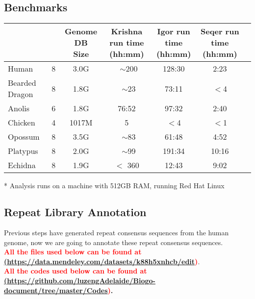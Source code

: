 \documentclass[12pt]{report}
\begin{document}
\subsection{Benchmarks}

\footnotesize  %
\setlength\tabcolsep{1.5pt}
\begin{center}
	\begin{tabular}{|l|c|c|c|c|c|c|}
		\hline
		\thead{Genome}	&	\thead{ Krishna Threads }	&	\thead{Genome DB \\ Size}	& \thead{Krishna run time \\ (hh:mm)}	&	\thead{Igor run time \\ (hh:mm)}	&	\thead{Seqer run time \\ (hh:mm)}  \\
		\hline
		Human	&	8	&	3.0G	&	~$\sim$200	&	128:30	&	2:23 \\
		\hline 
		Bearded Dragon	&	8	&	1.8G	&	~$\sim$23	&	73:11	&	$<$4 \\
		\hline
		Anolis	& 6	& 1.8G	& 76:52	&	97:32	& 2:40	\\
		\hline
		Chicken	&	4	&	1017M	&	5	&	$<$4 & $<$1 \\
		\hline
		Opossum	&	8	&	3.5G	&	~$\sim$83	&	61:48	&	4:52 \\
		\hline
		Platypus	&	8	&	2.0G	&	~$\sim$99	&	191:34	&	10:16 \\
		\hline
		Echidna	&	8	&	1.9G	&	$<$ 360	&	12:43	&	9:02 \\
		\hline
	\end{tabular}
\end{center}

* Analysis runs on a machine with 512GB RAM, running Red Hat Linux \\


\subsection{Repeat Library Annotation}
Previous steps have generated repeat consensus sequences from the human genome, now we are going to annotate these repeat consensus sequences. \\
\textbf{\textcolor{red}{All the files used below can be found at \href{<url>}(\url{https://data.mendeley.com/datasets/k88h5xnhcb/edit})}}. \\
\textbf{\textcolor{red}{All the codes used below can be found at \href{<url>}(\url{https://github.com/luzengAdelaide/Biogo-document/tree/master/Codes})}.} \\
\end{document}

